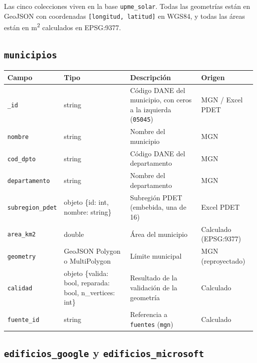 \documentclass[11pt,a4paper]{article}
\newcommand{\campo}[1]{\texttt{#1}}
\begin{document}
Las cinco colecciones viven en la base \campo{upme\_solar}. Todas las
geometrías están en GeoJSON con coordenadas \campo{[longitud, latitud]} en
WGS84, y todas las áreas están en m\textsuperscript{2} calculados en
EPSG:9377.

\subsection{\texorpdfstring{\campo{municipios}}{municipios}}

\begin{table}[H]
\centering\small
\begin{tabularx}{\textwidth}{@{}p{3cm}p{3.6cm}Lp{2.6cm}@{}}
\toprule
\textbf{Campo} & \textbf{Tipo} & \textbf{Descripción} & \textbf{Origen} \\
\midrule
\campo{\_id} & string  & Código DANE del municipio, con ceros a la izquierda (\campo{05045}) & MGN / Excel PDET \\
\campo{nombre} & string & Nombre del municipio & MGN \\
\campo{cod\_dpto} & string  & Código DANE del departamento & MGN \\
\campo{departamento} & string & Nombre del departamento & MGN \\
\campo{subregion\_pdet} & objeto \{id: int, nombre: string\} & Subregión PDET (embebida, una de 16) & Excel PDET \\
\campo{area\_km2} & double & Área del municipio & Calculado (EPSG:9377) \\
\campo{geometry} & GeoJSON Polygon o MultiPolygon & Límite municipal & MGN (reproyectado) \\
\campo{calidad} & objeto \{valida: bool, reparada: bool, n\_vertices: int\} & Resultado de la validación de la geometría & Calculado \\
\campo{fuente\_id} & string & Referencia a \campo{fuentes} (\campo{mgn}) & Calculado \\
\bottomrule
\end{tabularx}
\end{table}

\subsection{\texorpdfstring{\campo{edificios\_google} y \campo{edificios\_microsoft}}{edificios\_google y edificios\_microsoft}}
\end{document}
